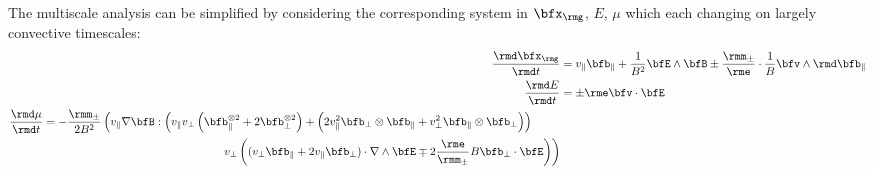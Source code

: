     \line

    The multiscale analysis can be simplified by considering the corresponding system in $\bfx_{\rmg}$, $E$, $\mu$ which each changing on largely convective timescales:
    \begin{align}
        \frac{\rmd\bfx_{\rmg}}{\rmd t}  &=  v_{\parallel}\bfb_{\parallel} + \frac{1}{B^{2}}\bfE\wedge\bfB \pm \frac{\rmm_{\pm}}{\rme}\cdot\frac{1}{B}\bfv\wedge\rmd\bfb_{\parallel}  \label{eqn:gyrocenter equation}  \\
                 \frac{\rmd E}{\rmd t}  &=  \pm\rme\bfv\cdot\bfE  \\
        \begin{split}
                \frac{\rmd\mu}{\rmd t}  &=  - \frac{\rmm_{\pm}}{2B^{2}}\left(v_{\parallel}\nabla\bfB:\left(v_{\parallel}v_{\perp}\left(\bfb_{\parallel}^{\otimes 2} + 2\bfb_{\perp}^{\otimes 2}\right) + \left(2v_{\parallel}^{2}\bfb_{\perp}\otimes\bfb_{\parallel} + v_{\perp}^{2}\bfb_{\parallel}\otimes\bfb_{\perp}\right)\right)\right.  \\
                             &\;\;\;\;\;\;\;\;\;\;\;\;\;\;\;\;\;\;\;\;\;\;\;\;\;\;\;\;\;\;\;\;\;\;\;\;\;\;\;\;\;\;\;\;\;\;\;\;\;\;\;\;\;\;\;\;\left.v_{\perp}\left((v_{\perp}\bfb_{\parallel} + 2v_{\parallel}\bfb_{\perp})\cdot\nabla\wedge\bfE \mp 2\frac{\rme}{\rmm_{\pm}}B\bfb_{\perp}\cdot\bfE\right)\right)  \label{eqn:magnetic moment equation}
        \end{split}
    \end{align}
    
